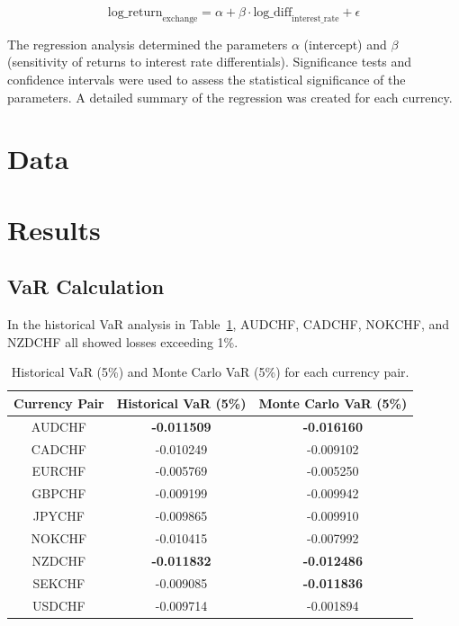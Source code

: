 \documentclass[a4paper, 12pt]{article}
\begin{document}
\[
\text{log\_return}_{\text{exchange}} = \alpha + \beta \cdot \text{log\_diff}_{\text{interest\_rate}} + \epsilon
\]

The regression analysis determined the parameters \(\alpha\) (intercept) and \(\beta\) (sensitivity of returns to interest rate differentials). Significance tests and confidence intervals were used to assess the statistical significance of the parameters. A detailed summary of the regression was created for each currency.

\section{Data}
\section{Results}
\subsection{VaR Calculation}
In the historical VaR analysis in Table~\ref{table:var}, AUDCHF, CADCHF, NOKCHF, and NZDCHF all showed losses exceeding 1\%. 

\begin{table}[!ht]
    \centering
    \begin{tabular}{|c|c|c|}
    \hline
        Currency Pair & Historical VaR (5\%) & Monte Carlo VaR (5\%) \\ \hline
        AUDCHF & \textbf{-0.011509} & \textbf{-0.016160} \\ \hline
        CADCHF & -0.010249 & -0.009102 \\ \hline
        EURCHF & -0.005769 & -0.005250 \\ \hline
        GBPCHF & -0.009199 & -0.009942 \\ \hline
        JPYCHF & -0.009865 & -0.009910 \\ \hline
        NOKCHF & -0.010415 & -0.007992 \\ \hline
        NZDCHF & \textbf{-0.011832} & \textbf{-0.012486} \\ \hline
        SEKCHF & -0.009085 & \textbf{-0.011836} \\ \hline
        USDCHF & -0.009714 & -0.001894 \\ \hline
    \end{tabular}
    \label{table:var}
    \caption{Historical VaR (5\%) and Monte Carlo VaR (5\%) for each currency pair.}
\end{table}
\end{document}
